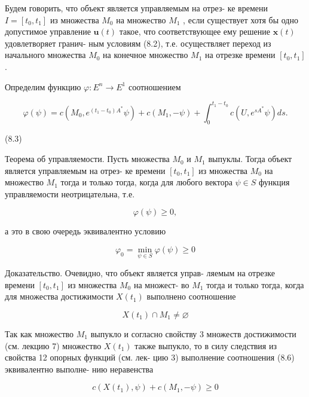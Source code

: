 \documentclass[8pt]{extarticle}
\begin{document}
Будем говорить, что объект является управляемым на отрез- ке времени \(I = \left\lbrack  {{t}_{0},{t}_{1}}\right\rbrack\) из множества \({M}_{0}\) на множество \({M}_{1}\) , если существует хотя бы одно допустимое управление \(\mathbf{u}\left( t\right)\) такое, что соответствующее ему решение \(\mathbf{x}\left( t\right)\) удовлетворяет гранич- ным условиям (8.2), т.е. осуществляет переход из начального множества \({M}_{0}\) на конечное множество \({M}_{1}\) на отрезке времени \(\left\lbrack  {{t}_{0},{t}_{1}}\right\rbrack\) .

Определим функцию \(\varphi  : {E}^{n} \rightarrow  {E}^{1}\) соотношением

\[
\varphi \left( \psi \right)  = c\left( {{M}_{0},{e}^{\left( {{t}_{1} - {t}_{0}}\right) {A}^{ * }}\psi }\right)  + c\left( {{M}_{1}, - \psi }\right)  + {\int }_{0}^{{t}_{1} - {t}_{0}}c\left( {U,{e}^{s{A}^{ * }}\psi }\right) {ds}.
\]

(8.3)

Теорема об управляемости. Пусть множества \({M}_{0}\) и \({M}_{1}\) выпуклы. Тогда объект является управляемым на отрез- ке времени \(\left\lbrack  {{t}_{0},{t}_{1}}\right\rbrack\) из множества \({M}_{0}\) на множество \({M}_{1}\) тогда и только тогда, когда для любого вектора \(\psi  \in  S\) функция управляемости неотрицательна, т.е.

\[
\varphi \left( \psi \right)  \geq  0, \tag{8.4}
\]

а это в свою очередь эквивалентно условию

\[
{\varphi }_{0} = \mathop{\min }\limits_{{\psi  \in  S}}\varphi \left( \psi \right)  \geq  0 \tag{8.5}
\]

Доказательство. Очевидно, что объект является управ- ляемым на отрезке времени \(\left\lbrack  {{t}_{0},{t}_{1}}\right\rbrack\) из множества \({M}_{0}\) на множест- во \({M}_{1}\) тогда и только тогда, когда для множества достижимости \(X\left( {t}_{1}\right)\) выполнено соотношение

\[
X\left( {t}_{1}\right)  \cap  {M}_{1} \neq  \varnothing \tag{8.6}
\]

Так как множество \({M}_{1}\) выпукло и согласно свойству 3 множеств достижимости (см. лекцию 7) множество \(X\left( {t}_{1}\right)\) также выпукло, то в силу следствия из свойства 12 опорных функций (см. лек- цию 3) выполнение соотношения (8.6) эквивалентно выполне- нию неравенства

\[
c\left( {X\left( {t}_{1}\right) ,\psi }\right)  + c\left( {{M}_{1}, - \psi }\right)  \geq  0
\]
\end{document}
